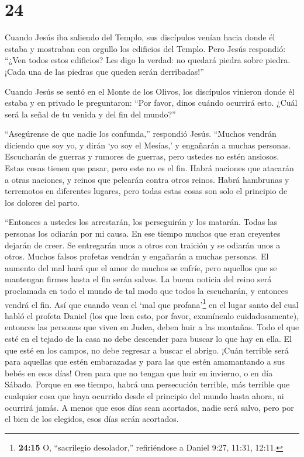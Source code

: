 \hypertarget{section-23}{%
\section{24}\label{section-23}}

 Cuando Jesús iba saliendo del Templo, sus discípulos venían
hacia donde él estaba y mostraban con orgullo los edificios del Templo.
 Pero Jesús respondió: ``¿Ven todos estos edificios? Les
digo la verdad: no quedará piedra sobre piedra. ¡Cada una de las piedras
que queden serán derribadas!''

 Cuando Jesús se sentó en el Monte de los Olivos, los
discípulos vinieron donde él estaba y en privado le preguntaron: ``Por
favor, dinos cuándo ocurrirá esto. ¿Cuál será la señal de tu venida y
del fin del mundo?''

 ``Asegúrense de que nadie los confunda,'' respondió Jesús.
 ``Muchos vendrán diciendo que soy yo, y dirán `yo soy el
Mesías,' y engañarán a muchas personas.  Escucharán de
guerras y rumores de guerras, pero ustedes no estén ansiosos. Estas
cosas tienen que pasar, pero este no es el fin.  Habrá
naciones que atacarán a otras naciones, y reinos que pelearán contra
otros reinos. Habrá hambrunas y terremotos en diferentes lugares,
 pero todas estas cosas son solo el principio de los dolores
del parto.

 ``Entonces a ustedes los arrestarán, los perseguirán y los
matarán. Todas las personas los odiarán por mi causa.  En
ese tiempo muchos que eran creyentes dejarán de creer. Se entregarán
unos a otros con traición y se odiarán unos a otros. 
Muchos falsos profetas vendrán y engañarán a muchas personas.
 El aumento del mal hará que el amor de muchos se enfríe,
 pero aquellos que se mantengan firmes hasta el fin serán
salvos.  La buena noticia del reino será proclamada en todo
el mundo de tal modo que todos la escucharán, y entonces vendrá el fin.
 Así que cuando vean el `mal que profana'\footnote{\textbf{24:15}
  O, ``sacrilegio desolador,'' refiriéndose a Daniel 9:27, 11:31, 12:11.}
en el lugar santo del cual habló el profeta Daniel (los que leen esto,
por favor, examínenlo cuidadosamente),  entonces las
personas que viven en Judea, deben huir a las montañas. 
Todo el que esté en el tejado de la casa no debe descender para buscar
lo que hay en ella.  El que esté en los campos, no debe
regresar a buscar el abrigo.  ¡Cuán terrible será para
aquellas que estén embarazadas y para las que estén amamantando a sus
bebés en esos días!  Oren para que no tengan que huir en
invierno, o en día Sábado.  Porque en ese tiempo, habrá una
persecución terrible, más terrible que cualquier cosa que haya ocurrido
desde el principio del mundo hasta ahora, ni ocurrirá jamás.
 A menos que esos días sean acortados, nadie será salvo,
pero por el bien de los elegidos, esos días serán acortados.

